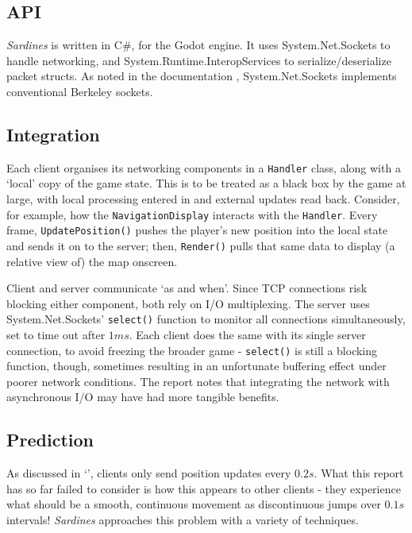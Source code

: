 \documentclass[a4paper, 10pt]{article}
\begin{document}
\begin{flushleft}
\subsection*{API}

\textit{Sardines} is written in C\#, for the Godot engine. It uses System.Net.Sockets to handle networking, and System.Runtime.InteropServices to serialize/deserialize packet structs. As noted in the documentation \citeyearpar{msftSNS}, System.Net.Sockets implements conventional Berkeley sockets.

\subsection*{Integration}

Each client organises its networking components in a \texttt{Handler} class, along with a `local' copy of the game state. This is to be treated as a black box by the game at large, with local processing entered in and external updates read back. Consider, for example, how the \texttt{NavigationDisplay} interacts with the \texttt{Handler}. Every frame, \texttt{UpdatePosition()} pushes the player's new position into the local state and sends it on to the server; then, \texttt{Render()} pulls that same data to display (a relative view of) the map onscreen.

\vspace{5pt}\noindent
Client and server communicate `as and when'. Since TCP connections risk blocking either component, both rely on I/O multiplexing. The server uses System.Net.Sockets' \texttt{select()} function to monitor all connections simultaneously, set to time out after $1ms$. Each client does the same with its single server connection, to avoid freezing the broader game - \texttt{select()} is still a blocking function, though, sometimes resulting in an unfortunate buffering effect under poorer network conditions. The report notes that integrating the network with asynchronous I/O may have had more tangible benefits.

\subsection*{Prediction}\label{Prediction}

As discussed in `',  clients only send position updates every $0.2s$. What this report has so far failed to consider is how this appears to other clients - they experience what should be a smooth, continuous movement as discontinuous jumps over $0.1s$ intervals! \textit{Sardines} approaches this problem with a variety of techniques.


\end{flushleft}
\end{document}
